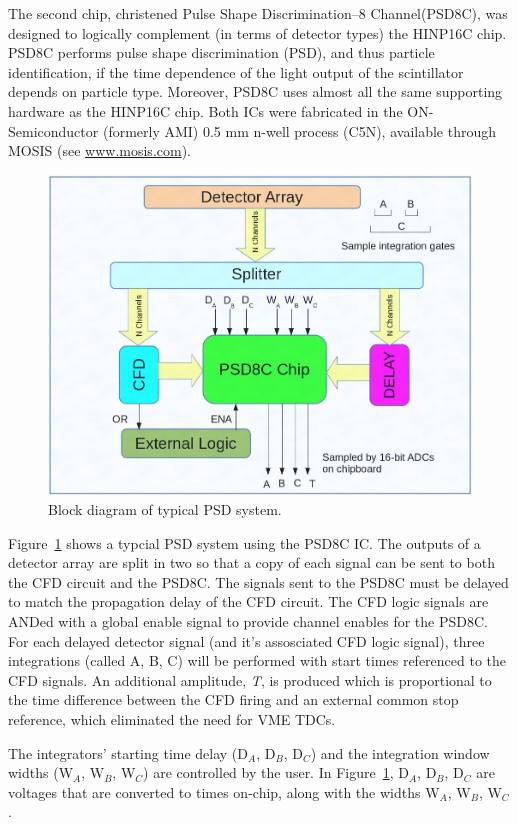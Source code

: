 \documentclass[12pt,oneside,final]{siuethesis}
\theoremstyle{definition}
\begin{document}
The second chip, christened Pulse Shape Discrimination--8 Channel(PSD8C), was designed to logically complement (in terms of detector types) the HINP16C chip. PSD8C performs pulse shape discrimination (PSD), and thus particle identification, if the time dependence of the light output of the scintillator depends on particle type. Moreover, PSD8C uses almost all the same supporting hardware as the HINP16C chip. Both ICs were fabricated in the ON-Semiconductor (formerly AMI) 0.5 mm n-well process (C5N), available through MOSIS (see \url{www.mosis.com}).

\begin{figure}[htbp!]
	\centering
 	\includegraphics[scale=0.6,keepaspectratio=true]{./ch1_figures/PSD_block.png}
 	\caption{Block diagram of typical PSD system.}
 	\label{FIG:PSD_BLOCK}
\end{figure}

\par Figure~\ref{FIG:PSD_BLOCK} shows a typcial PSD system using the PSD8C IC. The outputs of a detector array are split in two so that a copy of each signal can be sent to both the CFD circuit and the PSD8C. The signals sent to the PSD8C must be delayed to match the propagation delay of the CFD circuit. The CFD logic signals are ANDed with a global enable signal to provide channel enables for the PSD8C. For each delayed detector signal (and it's assosciated CFD logic signal), three integrations (called A, B, C) will be performed with start times referenced to the CFD signals. An additional amplitude, \emph{T}, is produced which is proportional to the time difference between the CFD firing and an external common stop reference, which eliminated the need for VME TDCs.
\par The integrators' starting time delay (D$_{A}$, D$_{B}$, D$_{C}$) and the integration window widths (W$_{A}$, W$_{B}$, W$_{C}$) are controlled by the user. In Figure~\ref{FIG:PSD_BLOCK}, D$_{A}$, D$_{B}$, D$_{C}$ are voltages that are converted to times on-chip, along with the widths W$_{A}$, W$_{B}$, W$_{C}$.
\end{document}
